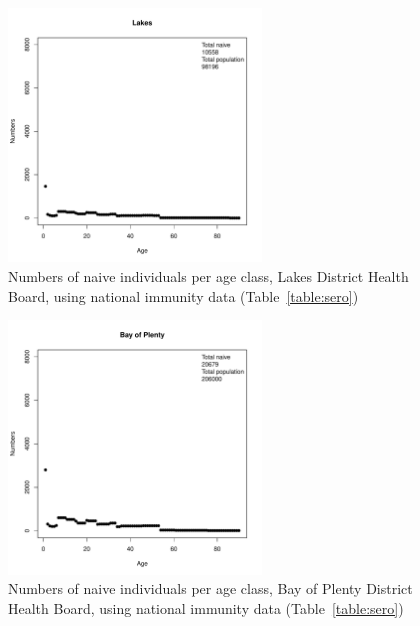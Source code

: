\documentclass{article}
\begin{document}
\begin{figure}[H]
     \begin{center}
     \includegraphics[width=0.6\textwidth]{dhb6.pdf}
     \end{center}
     \caption{Numbers of naive individuals per age class, Lakes District Health Board, using national immunity data (Table~\ref{table:sero})}
     \label{fig:Lakes}
\end{figure}

\begin{figure}[H]
     \begin{center}
     \includegraphics[width=0.6\textwidth]{dhb7.pdf}
     \end{center}
     \caption{Numbers of naive individuals per age class, Bay of Plenty District Health Board, using national immunity data (Table~\ref{table:sero})}
     \label{fig:BayofPlenty}
\end{figure}
\end{document}
